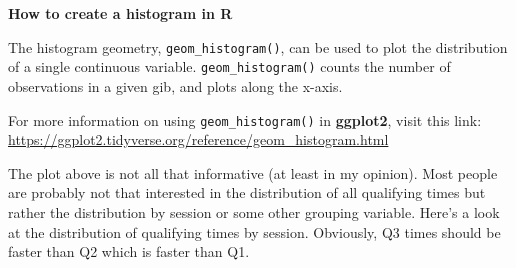 \documentclass[
]{book}
\begin{document}
\begin{blackbox}

\begin{center}
\textbf{How to create a histogram in R}

\end{center}

The histogram geometry, \texttt{geom\_histogram()}, can be used to plot the distribution of a single continuous variable. \texttt{geom\_histogram()} counts the number of observations in a given gib, and plots along the x-axis.

For more information on using \texttt{geom\_histogram()} in \textbf{ggplot2}, visit this link: \url{https://ggplot2.tidyverse.org/reference/geom_histogram.html}

\end{blackbox}

The plot above is not all that informative (at least in my opinion). Most people are probably not that interested in the distribution of all qualifying times but rather the distribution by session or some other grouping variable. Here's a look at the distribution of qualifying times by session. Obviously, Q3 times should be faster than Q2 which is faster than Q1.
\end{document}
